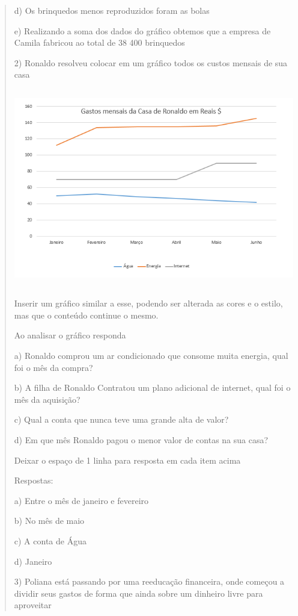 \begin{quote}
\begin{escolha}
d) Os brinquedos menos reproduzidos foram as bolas

e) Realizando a soma dos dados do gráfico obtemos que a empresa de
Camila fabricou ao total de 38 400 brinquedos

2) Ronaldo resolveu colocar em um gráfico todos os custos mensais de sua
casa

\includegraphics[width=5.30833in,height=3.41384in]{./imgSAEB_8_MAT/media/image40.png}

Inserir um gráfico similar a esse, podendo ser alterada as cores e o
estilo, mas que o conteúdo continue o mesmo.

Ao analisar o gráfico responda

a) Ronaldo comprou um ar condicionado que consome muita energia, qual
foi o mês da compra?

b) A filha de Ronaldo Contratou um plano adicional de internet, qual foi
o mês da aquisição?

c) Qual a conta que nunca teve uma grande alta de valor?

d) Em que mês Ronaldo pagou o menor valor de contas na sua casa?

Deixar o espaço de 1 linha para resposta em cada item acima

Respostas:

a) Entre o mês de janeiro e fevereiro

b) No mês de maio

c) A conta de Água

d) Janeiro

3) Poliana está passando por uma reeducação financeira, onde começou a
dividir seus gastos de forma que ainda sobre um dinheiro livre para
aproveitar


\end{escolha}
\end{quote}

